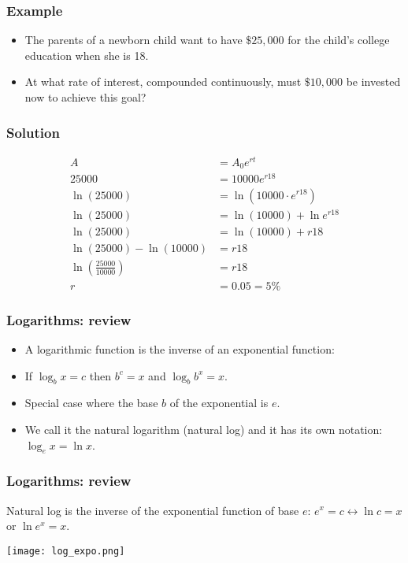 \documentclass[xcolor=dvipsnames]{beamer} %
\begin{document}
\begin{frame}
\frametitle{Example}
\begin{itemize}
    \setlength\itemsep{1em}
\item[] The parents of a newborn child want to have $\$25,000$ for the child's college education when she is 18. 
\item[] At what rate of interest, compounded continuously, must $\$10,000$ be invested now to achieve this goal? 
\end{itemize}
\end{frame}

\begin{frame}
\frametitle{Solution}

\begin{align*}
A &= A_0 e^{rt} \\
25000 &= 10000 e^{r18} \\
\ln(25000) &= \ln(10000 \cdot e^{r18} ) \\
\ln (25000) &= \ln (10000) + \ln e^{r18} \\
\ln (25000) &= \ln (10000) + r18 \\
\ln (25000) - \ln(10000) &= r18 \\ 
\ln ( \frac{25000}{10000}) &= r18 \\
r &= 0.05 = 5\%
\end{align*}
\end{frame}

\begin{frame}
\frametitle{Logarithms: review}
\begin{itemize}
\item A logarithmic function is the inverse of an exponential function:
\item[] If $\log_b x = c$ then $b^c = x$ and $\log_b b^x = x$. 
\item Special case where the base $b$ of the exponential is $e$.
\item We call it the natural logarithm (\textcolor{dark_red}{natural log}) and it has its own notation: \textcolor{dark_red}{$\log_e x = \ln x$}. 
\end{itemize}
\end{frame}

\begin{frame}
\frametitle{Logarithms: review}
Natural log is the inverse of the exponential function of base $e$: $e^x = c \leftrightarrow \ln c = x$ or $\ln e^x = x$. 

\begin{center}
\texttt{[image: log\_expo.png]}
\end{center}
\end{frame}
\end{document}
